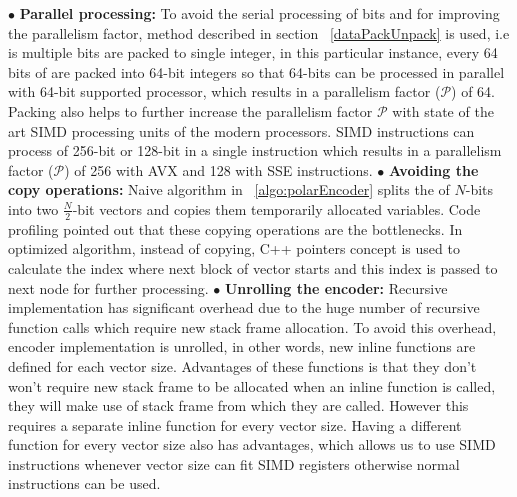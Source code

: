 $\bullet$ \textbf{Parallel processing:} To avoid the serial processing of bits and for improving the parallelism factor, method described in section ~\ref{dataPackUnpack} is used, i.e is multiple bits are packed to single integer, in this particular instance, every 64 bits of are packed into 64-bit integers so that 64-bits can be processed in parallel with 64-bit supported processor, which results in a parallelism factor ($\mathcal{P}$) of 64. Packing also helps to further increase the parallelism factor $\mathcal{P}$ with state of the art SIMD processing units of the modern processors. SIMD instructions can process of 256-bit or 128-bit in a single instruction which results in a parallelism factor ($\mathcal{P}$) of 256 with AVX and 128 with SSE instructions. \newline
\newline
$\bullet$ \textbf{Avoiding the copy operations:} Naive algorithm in ~\ref{algo:polarEncoder} splits the of $N$-bits into two $\frac{N}{2}$-bit vectors and copies them temporarily allocated variables. Code profiling pointed out that these copying operations are the bottlenecks. In optimized algorithm, instead of copying, C++ pointers concept is used to calculate the index where next block of vector starts and this index is passed to next node for further processing. \newline
\newline
$\bullet$ \textbf{Unrolling the encoder:} Recursive implementation has significant overhead due to the huge number of recursive function calls which require new stack frame allocation. To avoid this overhead, encoder implementation is unrolled, in other words, new inline functions are defined for each vector size. Advantages of these functions is that they don't won't require new stack frame to be allocated when an inline function is called, they will make use of stack frame from which they are called. However this requires a separate inline function for every vector size. Having a different function for every vector size also has advantages, which allows us to use SIMD instructions whenever vector size can fit SIMD registers otherwise normal instructions can be used. \newline
\newline
